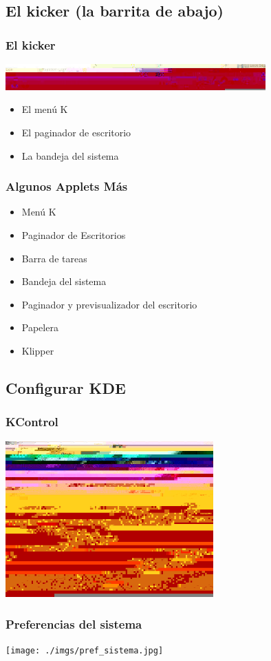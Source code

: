 \subsection{El kicker (la barrita de abajo)}
\frame
{
	\frametitle{El kicker}
	\begin{center}
		\includegraphics[height=1cm,width=10cm]{./imgs/kicker.jpg}
	\end{center}
	\begin{itemize}
		\item{El menú K}
		\item{El paginador de escritorio}
		\item{La bandeja del sistema}
	\end{itemize}
}
\frame
{
	\frametitle{Algunos Applets Más}
	\begin{itemize}
		\item<1->{Menú K}
		\item<2->{Paginador de Escritorios}
		\item<3->{Barra de tareas}
		\item<4->{Bandeja del sistema}
		\item<5->{Paginador y previsualizador del escritorio}
		\item<6->{Papelera}
		\item<7->{Klipper}
	\end{itemize}
}
\subsection{Configurar KDE}
\frame
{
	\frametitle{KControl}
	\begin{center}
		\includegraphics[height=6cm]{./imgs/kcontrol.jpg}
	\end{center}
}
\frame
{
	\frametitle{Preferencias del sistema}
	\begin{center}
		\texttt{[image: ./imgs/pref\_sistema.jpg]}
	\end{center}
}
